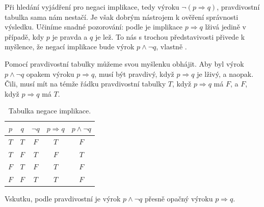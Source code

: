\begin{example}
  \label{exam:negace-implikace}
  Při hledání vyjádření pro negaci implikace, tedy výroku $\neg (p \Rightarrow
  q)$, pravdivostní tabulka sama nám nestačí. Je však dobrým nástrojem k ověření
  správnosti výsledku. Učiníme snadné pozorování: podle
   je implikace $p \Rightarrow q$
  lživá jedině v případě, kdy $p$ je pravda a $q$ je lež. To nás s trochou
  představivosti přivede k myšlence, že negací implikace bude výrok $p \wedge
  \neg q$, vlastně .

  Pomocí pravdivostní tabulky můžeme svou myšlenku obhájit. Aby byl výrok $p
  \wedge \neg q$ opakem výroku $p \Rightarrow q$, musí být pravdivý, když $p
  \Rightarrow q$ je lživý, a naopak. Čili, musí mít na témže řádku pravdivostní
  tabulky $T$, když $p \Rightarrow q$ má $F$, a $F$, když $p \Rightarrow q$ má
  $T$.

  \begin{table}[ht]
    \centering
    \begin{tabular}{cc|ccc}
      $p$ & $q$ & $\neg q$ & $p \Rightarrow q$ & $p \wedge \neg q$\\[3pt]
      \toprule
      $T$ & $T$ & $F$ & $T$ & $F$\\
      $T$ & $F$ & $T$ & $F$ & $T$\\
      $F$ & $T$ & $F$ & $T$ & $F$\\
      $F$ & $F$ & $T$ & $T$ & $F$\\
      \bottomrule
    \end{tabular}

    \caption{Tabulka negace implikace.}
    \label{table:negace-implikace}
  \end{table}
  Vskutku, podle pravdivostní  je výrok
  $p \wedge \neg q$ přesně opačný výroku $p \Rightarrow q$.
\end{example}
